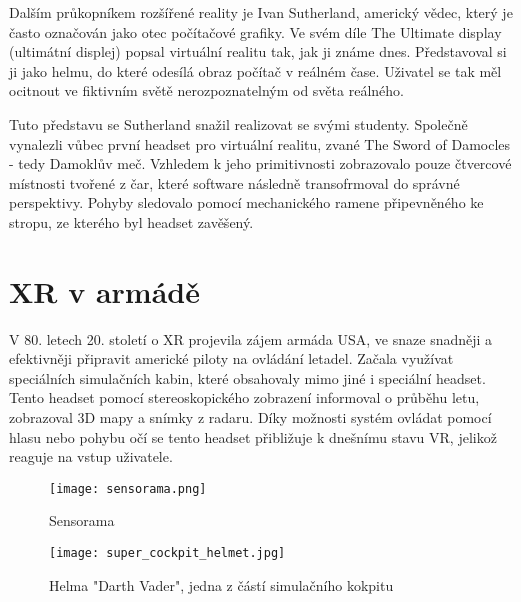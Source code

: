 Dalším průkopníkem rozšířené reality je Ivan Sutherland, americký vědec, který je často označován jako otec počítačové grafiky. Ve svém díle The Ultimate display (ultimátní displej) popsal virtuální realitu tak, jak ji známe dnes. Představoval si ji jako helmu, do které odesílá obraz počítač v reálném čase. Uživatel se tak měl ocitnout ve fiktivním světě nerozpoznatelným od světa reálného. \cite{otechnice} \cite{ivan_sutherland_bio}

Tuto představu se Sutherland snažil realizovat se svými studenty. Společně vynalezli vůbec první headset pro virtuální realitu, zvané The Sword of Damocles - tedy Damoklův meč. Vzhledem k jeho primitivnosti zobrazovalo pouze čtvercové místnosti tvořené z čar, které software následně transofrmoval do správné perspektivy. Pohyby sledovalo pomocí mechanického ramene připevněného ke stropu, ze kterého byl headset zavěšený. \cite{otechnice} \cite{Rheingold_1992}

\section{XR v armádě}

V 80. letech 20. století o XR projevila zájem armáda USA, ve snaze snadněji a efektivněji připravit americké piloty na ovládání letadel. Začala využívat speciálních simulačních kabin, které obsahovaly mimo jiné i speciální headset. Tento headset pomocí stereoskopického zobrazení informoval o průběhu letu, zobrazoval 3D mapy a snímky z radaru. Díky možnosti systém ovládat pomocí hlasu nebo pohybu očí se tento headset přibližuje k dnešnímu stavu VR, jelikož reaguje na vstup uživatele. \cite{otechnice}


\begin{figure}[H]
    \centering

    \begin{minipage}{.5\textwidth}
        \centering
        \texttt{[image: sensorama.png]}
        \caption{Sensorama \cite{sensorama_patent}}
        \label{sensorama_fig}
    \end{minipage}%
    \begin{minipage}{.5\textwidth}
        \centering
        \texttt{[image: super\_cockpit\_helmet.jpg]}
        \caption{Helma "Darth Vader", jedna z částí simulačního kokpitu \cite{super_cockpit_image}}
        \label{sensorama}
    \end{minipage}

\end{figure}

